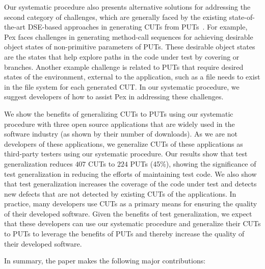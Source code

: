 Our systematic procedure also presents alternative solutions for addressing the second category of challenges, which are generally faced by the existing state-of-the-art DSE-based approaches in generating CUTs from PUTs~\cite{}. For example, Pex faces challenges in generating method-call sequences for achieving desirable object states of non-primitive parameters of PUTs. These desirable object states are the states that help explore paths in the code under test by covering  or  branches. Another example challenge is related to PUTs that require desired states of the environment, external to the application, such as a file needs to exist in the file system for each
generated CUT. In our systematic procedure, we suggest developers of how to assist Pex in addressing these challenges.

We show the benefits of generalizing CUTs to PUTs using our systematic procedure with three open source applications that are widely used in the software industry (as shown by their number of downloads). As we are not developers of these applications, we generalize CUTs of these applications as third-party testers using our systematic procedure. Our results show that test generalization reduces $407$ CUTs to $224$ PUTs (45\%), showing the significance of test generalization in reducing the efforts of maintaining test code. We also show that test generalization increases the coverage of the code under test and detects new defects that are not detected by existing CUTs of the applications. In practice, many developers use CUTs as a primary means for ensuring the quality of their developed software. Given the benefits of test generalization, we expect that these developers can use our systematic procedure and generalize their CUTs to PUTs to leverage the benefits of PUTs and thereby increase the quality of their developed software.

In summary, the paper makes the following major contributions:

